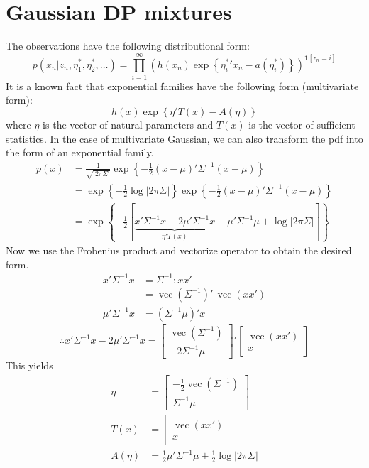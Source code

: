 \documentclass[11pt]{article}
\newcommand{\bs}{\boldsymbol}
\newcommand{\opn}{\operatorname}
\begin{document}
\section{Gaussian DP mixtures}
The observations have the following distributional form:
$$
  p(x_{n}|z_{n}, \eta_{1}^{*}, \eta_{2}^{*}, \ldots) = \prod_{i=1}^{\infty} \left(h(x_{n})\exp\left\{{\eta_{i}^{*}}'x_{n} - a\left(\eta_{i}^{*} \right) \right\} \right)^{\bs{1}\left[z_{n}=i \right]}
$$
It is a known fact that exponential families have the following form (multivariate form):
$$
  h(x)\exp \left\{\eta'T(x)-A(\eta) \right\}
$$
where $\eta$ is the vector of natural parameters and $T(x)$ is the vector of sufficient statistics. In the case of multivariate Gaussian, we can also transform the pdf into the form of an exponential family.
$$
  \begin{align*} p(x) &= \frac{1}{\sqrt{\left|2\pi  \Sigma \right|}} \exp \left\{-\frac{1}{2}\left(x-\mu\right)'\Sigma^{-1}\left(x-\mu \right) \right\}\\ &= \exp \left\{-\frac{1}{2}\log\left|2\pi\Sigma \right| \right\}\exp \left\{-\frac{1}{2}\left(x-\mu\right)'\Sigma^{-1}\left(x-\mu \right) \right\}\\ &= \exp \left\{-\frac{1}{2}\left[\underbrace{x'\Sigma^{-1}x - 2\mu'\Sigma^{-1}x}_{\eta'T\left(x\right)} + \mu'\Sigma^{-1}\mu + \log\left|2\pi\Sigma\right|\right] \right\} \end{align*}
$$
Now we use the Frobenius product and vectorize operator to obtain the desired form.
$$
  \begin{align*} x'\Sigma^{-1}x &= \Sigma^{-1}:xx'\\ &= \operatorname{vec}\left(\Sigma^{-1}\right)' \,\operatorname{vec}\left(xx' \right)  \\ \mu' \Sigma^{-1} x &= \left(\Sigma^{-1}\mu \right)'x\end{align*}
$$
$$
  \therefore x'\Sigma^{-1}x - 2\mu'\Sigma^{-1}x = \begin{bmatrix}\operatorname{vec}\left(\Sigma^{-1}\right) \\ -2\Sigma^{-1}\mu \end{bmatrix}'\begin{bmatrix}\operatorname{vec}\left(xx'\right) \\ x \end{bmatrix}
$$
This yields
\begin{align*}
  \eta &= \begin{bmatrix} -\frac{1}{2}\opn{vec}\left(\Sigma^{-1} \right) \\ \Sigma^{-1}\mu       \end{bmatrix}\\
  T(x) &= \begin{bmatrix} \opn{vec}\left(xx' \right) \\ x   \end{bmatrix}\\
  A(\eta) &= \frac{1}{2}\mu'\Sigma^{-1}\mu + \frac{1}{2}\log\left|2\pi\Sigma \right|
\end{align*}
\end{document}
